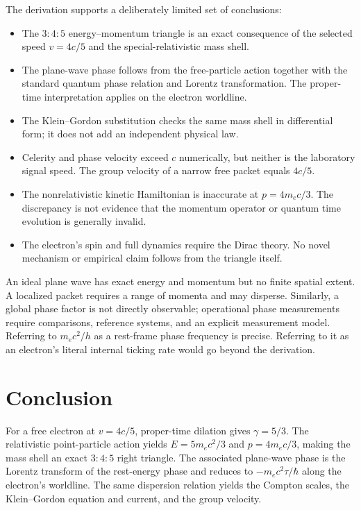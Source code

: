 \documentclass[12pt]{article}
\begin{document}
The derivation supports a deliberately limited set of conclusions:
\begin{itemize}
  \item The $3{:}4{:}5$ energy--momentum triangle is an exact consequence of the selected speed $v=4c/5$ and the special-relativistic mass shell.
  \item The plane-wave phase follows from the free-particle action together with the standard quantum phase relation and Lorentz transformation. The proper-time interpretation applies on the electron worldline.
  \item The Klein--Gordon substitution checks the same mass shell in differential form; it does not add an independent physical law.
  \item Celerity and phase velocity exceed $c$ numerically, but neither is the laboratory signal speed. The group velocity of a narrow free packet equals $4c/5$.
  \item The nonrelativistic kinetic Hamiltonian is inaccurate at $p=4m_ec/3$. The discrepancy is not evidence that the momentum operator or quantum time evolution is generally invalid.
  \item The electron's spin and full dynamics require the Dirac theory. No novel mechanism or empirical claim follows from the triangle itself.
\end{itemize}

An ideal plane wave has exact energy and momentum but no finite spatial extent. A localized packet requires a range of momenta and may disperse. Similarly, a global phase factor is not directly observable; operational phase measurements require comparisons, reference systems, and an explicit measurement model. Referring to $m_ec^2/h$ as a rest-frame phase frequency is precise. Referring to it as an electron's literal internal ticking rate would go beyond the derivation.

\section{Conclusion}

For a free electron at $v=4c/5$, proper-time dilation gives $\gamma=5/3$. The relativistic point-particle action yields $E=5m_ec^2/3$ and $p=4m_ec/3$, making the mass shell an exact $3{:}4{:}5$ right triangle. The associated plane-wave phase is the Lorentz transform of the rest-energy phase and reduces to $-m_ec^2\tau/\hbar$ along the electron's worldline. The same dispersion relation yields the Compton scales, the Klein--Gordon equation and current, and the group velocity.
\end{document}
